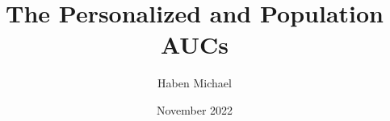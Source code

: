 \documentclass{beamer}
\title{The Personalized and Population AUCs}
\author{Haben Michael}
\date{November 2022}
\begin{document}
\begin{frame}
  \titlepage
\end{frame}











\end{document}
